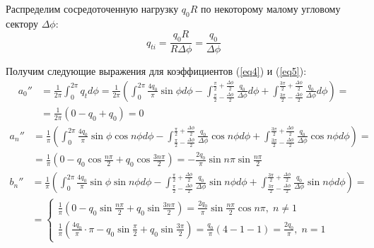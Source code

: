 Распределим сосредоточенную нагрузку $q_0R$ по некоторому малому угловому сектору $\Delta\phi$:
\begin{equation}
    \label{eq8.1}
    q_{ti} = \frac{q_0R}{R \Delta \phi} = \frac{q_0}{\Delta \phi}
\end{equation}

Получим следующие выражения для коэффициентов (\ref{eq4}) и (\ref{eq5}):
\begin{equation}
    \label{eq8.2}
    \begin{split}
        a_0'' & = \frac{1}{2\pi} \int_{0}^{2\pi} q_t d\phi = \frac{1}{2\pi} \left(   \int_{0}^{2\pi} \frac{4q_0}{\pi}\sin \phi d\phi - \int_{\frac{\pi}{2} - \frac{\Delta\phi}{2}}^{\frac{\pi}{2} + \frac{\Delta\phi}{2}}\frac{q_0}{\Delta \phi} d\phi + \int_{\frac{3\pi}{2} - \frac{\Delta\phi}{2}}^{\frac{3\pi}{2} + \frac{\Delta\phi}{2}} \frac{q_0}{\Delta \phi} d\phi \right) =
        \\
        & = \frac{1}{2\pi} \left( 0 - q_0 + q_0 \right) = 0
    \end{split}
\end{equation}
\begin{equation}
    \label{eq8.3}
    \begin{split}
        a_n'' & = \frac{1}{\pi} \left( \int_{0}^{2\pi} \frac{4q_0}{\pi}\sin \phi \cos n\phi d\phi - \int_{\frac{\pi}{2} - \frac{\Delta\phi}{2}}^{\frac{\pi}{2} + \frac{\Delta\phi}{2}}\frac{q_0}{\Delta \phi} \cos n\phi d\phi + \int_{\frac{3\pi}{2} - \frac{\Delta\phi}{2}}^{\frac{3\pi}{2} + \frac{\Delta\phi}{2}}\frac{q_0}{\Delta \phi} \cos n\phi d\phi \right) = 
        \\
        & = \frac{1}{\pi} \left( 0 - q_0 \cos \frac{n\pi}{2} + q_0 \cos \frac{3n\pi}{2} \right) = - \frac{2q_0}{\pi} \sin n\pi \sin \frac{n\pi}{2}
    \end{split}
\end{equation}
\begin{equation}
    \label{eq8.4}
    \begin{split}
        b_n'' & = \frac{1}{\pi} \left( \int_{0}^{2\pi} \frac{4q_0}{\pi}\sin \phi \sin n\phi d\phi - \int_{\frac{\pi}{2} - \frac{\Delta\phi}{2}}^{\frac{\pi}{2} + \frac{\Delta\phi}{2}}\frac{q_0}{\Delta \phi} \sin n\phi d\phi + \int_{\frac{3\pi}{2} - \frac{\Delta\phi}{2}}^{\frac{3\pi}{2} + \frac{\Delta\phi}{2}}\frac{q_0}{\Delta \phi} \sin n\phi d\phi \right) = 
        \\
        & = 
        \begin{cases}
            \displaystyle \frac{1}{\pi} \left( 0 - q_0 \sin \frac{n\pi}{2} + q_0 \sin \frac{3n\pi}{2} \right) = \frac{2q_0}{\pi} \sin \frac{n\pi}{2} \cos n\pi, \; n \neq 1
            \\[10pt]
            \displaystyle \frac{1}{\pi} \left( \frac{4q_0}{\pi} \cdot \pi - q_0 \sin \frac{\pi}{2} + q_0 \sin \frac{3\pi}{2} \right) = \frac{q_0}{\pi} \left( 4 - 1 - 1 \right) = \frac{2q_0}{\pi}, \; n = 1
        \end{cases}
    \end{split}
\end{equation}
